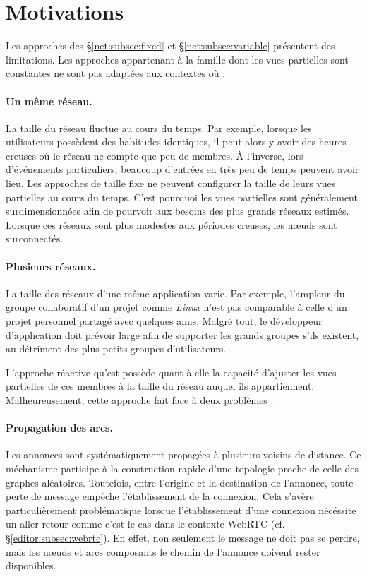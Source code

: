 
\section{Motivations}
\label{net:sec:motivations}

Les approches des §\ref{net:subsec:fixed} et §\ref{net:subsec:variable} présentent des
limitations. Les approches appartenant à la famille dont les vues partielles
sont constantes ne sont pas adaptées aux contextes où :

\paragraph{Un même réseau.} La taille du réseau fluctue au cours du temps. Par
exemple, lorsque les utilisateurs possèdent des habitudes identiques, il peut
alors y avoir des heures creuses où le réseau ne compte que peu de membres. À
l'inverse, lors d'événements particuliers, beaucoup d'entrées en très peu de
temps peuvent avoir lieu.  Les approches de taille fixe ne peuvent configurer la
taille de leurs vues partielles au cours du temps. C'est pourquoi les vues
partielles sont généralement surdimensionnées afin de pourvoir aux besoins des
plus grands réseaux estimés. Lorsque ces réseaux sont plus modestes aux périodes
creuses, les nœuds sont surconnectés.

\paragraph{Plusieurs réseaux.} La taille des réseaux d'une même application
varie. Par exemple, l'ampleur du groupe collaboratif d'un projet comme
\emph{Linux} n'est pas comparable à celle d'un projet personnel partagé avec
quelques amis. Malgré tout, le développeur d'application doit prévoir large afin
de supporter les grands groupes s'ils existent, au détriment des plus petits
groupes d'utilisateurs.



L'approche réactive qu'est \SCAMP possède quant à elle la capacité d'ajuster les
vues partielles de ces membres à la taille du réseau auquel ils
appartiennent. Malheureusement, cette approche fait face à deux problèmes :

\paragraph{Propagation des arcs.} Les annonces sont systématiquement propagées à
plusieurs voisins de distance. Ce méchanisme participe à la construction rapide
d'une topologie proche de celle des graphes aléatoires. Toutefois, entre
l'origine et la destination de l'annonce, toute perte de message empêche
l'établissement de la connexion. Cela s'avère particulièrement problématique
lorsque l'établissement d'une connexion nécéssite un aller-retour comme c'est le
cas dans le contexte WebRTC (cf. §\ref{editor:subsec:webrtc}). En effet, non
seulement le message ne doit pas se perdre, mais les nœuds et arcs composants le
chemin de l'annonce doivent rester disponibles.

